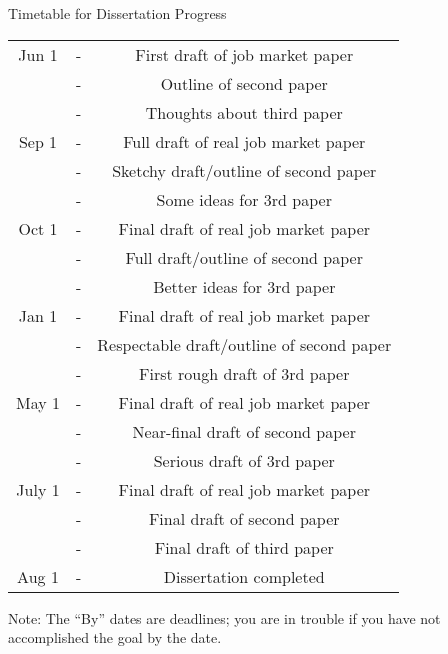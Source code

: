 \documentclass{\classes/econtex}
\begin{document}
\vfill\eject\pagebreak
\centerline{\LARGE Timetable for Dissertation Progress}

\begin{center}
\begin{tabular}{|ccc|}\hline
     Jun 1 & - & First draft of job market paper
\\       & - & Outline of second paper
\\       & - & Thoughts about third paper
\\   Sep 1 & - & Full draft of real job market paper
\\     & - & Sketchy draft/outline of second paper
\\     & - & Some ideas for 3rd paper
\\ Oct 1 & - & Final draft of real job market paper
\\     & - & Full draft/outline of second paper
\\     & - & Better ideas for 3rd paper
\\ Jan 1 & - & Final draft of real job market paper
\\     & - & Respectable draft/outline of second paper
\\     & - & First rough draft of 3rd paper
\\ May 1 & - & Final draft of real job market paper
\\     & - & Near-final draft of second paper
\\     & - & Serious draft of 3rd paper
\\ July 1 & - & Final draft of real job market paper
\\     & - & Final draft of second paper
\\     & - & Final draft of third paper
\\ Aug 1 & - & Dissertation completed
\\ \hline 
\end{tabular}
\end{center}



Note: The ``By'' dates are deadlines; you are in trouble if you have not
accomplished the goal by the date.
\end{document}
